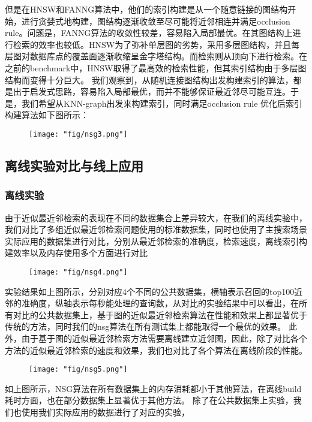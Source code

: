 但是在HNSW和FANNG算法中，他们的索引构建是从一个随意链接的图结构开始，进行贪婪式地构建，图结构逐渐收敛至尽可能将近邻相连并满足occlusion rule。问题是，FANNG算法的收敛性较差，容易陷入局部最优。在其图结构上进行检索的效率也较低。HNSW为了弥补单层图的劣势，采用多层图结构，并且每层图对数据库点的覆盖面逐渐收缩呈金字塔结构。而检索则从顶向下进行检索。在之前的benchmark中，HNSW取得了最高效的检索性能，但其索引结构由于多层图结构而变得十分巨大。
我们观察到，从随机连接图结构出发构建索引的算法，都是出于启发式思路，容易陷入局部最优，而并不能够保证最近邻尽可能互连。于是，我们希望从KNN-graph出发来构建索引，同时满足occlusion rule
优化后索引构建算法如下图所示：
\begin{figure}[!h]
	\centering
	\texttt{[image: "fig/nsg3.png"]}
	\caption{}
	\label{fig:nsg3}
\end{figure}

\subsection{离线实验对比与线上应用}
\subsubsection{离线实验}
由于近似最近邻检索的表现在不同的数据集合上差异较大，在我们的离线实验中，我们对比了多组近似最近邻检索问题使用的标准数据集，同时也使用了主搜索场景实际应用的数据集进行对比，分别从最近邻检索的准确度，检索速度，离线索引构建效率以及内存使用多个方面进行对比
\begin{figure}[!h]
	\centering
	\texttt{[image: "fig/nsg4.png"]}
	\caption{}
	\label{fig:nsg4}
\end{figure}

实验结果如上图所示，分别对应4个不同的公共数据集，横轴表示召回的top100近邻的准确度，纵轴表示每秒能处理的查询数，从对比的实验结果中可以看出，在所有对比的公共数据集上，基于图的近似最近邻检索算法在性能和效果上都显著优于传统的方法，同时我们的nsg算法在所有测试集上都能取得一个最优的效果。
此外，由于基于图的近似最近邻检索方法需要离线建立近邻图，因此，除了对比各个方法的近似最近邻检索的速度和效果，我们也对比了各个算法在离线阶段的性能。
\begin{figure}[!h]
	\centering
	\texttt{[image: "fig/nsg5.png"]}
	\caption{}
	\label{fig:nsg5}
\end{figure}
如上图所示，NSG算法在所有数据集上的内存消耗都小于其他算法，在离线build耗时方面，也在部分数据集上显著优于其他方法。
除了在公共数据集上实验，我们也使用我们实际应用的数据进行了对应的实验，

